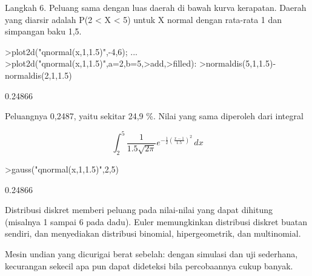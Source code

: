 \documentclass[a4paper,10pt]{article}
\begin{document}
\begin{eulernotebook}
\begin{eulercomment}
\begin{eulercomment}
\begin{eulercomment}
\begin{eulercomment}
\begin{eulercomment}
\begin{eulercomment}
\begin{eulercomment}
\begin{eulercomment}
\begin{eulercomment}
\begin{eulercomment}
\begin{eulercomment}
Langkah 6. Peluang sama dengan luas daerah di bawah kurva kerapatan. Daerah yang diarsir
adalah P(2 \textless{} X \textless{} 5) untuk X normal dengan rata-rata 1 dan simpangan baku 1,5.
\end{eulercomment}
\begin{eulerprompt}
>plot2d("qnormal(x,1,1.5)",-4,6);  ...
>plot2d("qnormal(x,1,1.5)",a=2,b=5,>add,>filled):
>normaldis(5,1,1.5)-normaldis(2,1,1.5)
\end{eulerprompt}
\begin{euleroutput}
  0.24866
\end{euleroutput}
\begin{eulercomment}
Peluangnya 0,2487, yaitu sekitar 24,9 \%. Nilai yang sama diperoleh dari integral
\end{eulercomment}
\begin{eulerformula}
\[
\int_2^5 \frac{1}{1.5\sqrt{2\pi}}e^{-\frac{1}{2}\left(\frac{x-1}{1.5}\right)^2}\,dx
\]
\end{eulerformula}
\begin{eulerprompt}
>gauss("qnormal(x,1,1.5)",2,5)
\end{eulerprompt}
\begin{euleroutput}
  0.24866
\end{euleroutput}
\begin{eulercomment}
\begin{eulercomment}
\begin{eulercomment}
\end{eulercomment}
\begin{eulercomment}
Distribusi diskret memberi peluang pada nilai-nilai yang dapat dihitung (misalnya 1 sampai
6 pada dadu). Euler memungkinkan distribusi diskret buatan sendiri, dan menyediakan
distribusi binomial, hipergeometrik, dan multinomial.

\end{eulercomment}
\begin{eulercomment}
Mesin undian yang dicurigai berat sebelah: dengan simulasi dan uji sederhana, kecurangan
sekecil apa pun dapat dideteksi bila percobaannya cukup banyak.


\end{eulercomment}
\end{eulercomment}
\end{eulercomment}
\end{eulercomment}
\end{eulercomment}
\end{eulercomment}
\end{eulercomment}
\end{eulercomment}
\end{eulercomment}
\end{eulercomment}
\end{eulercomment}
\end{eulercomment}
\end{eulercomment}
\end{eulernotebook}
\end{document}
